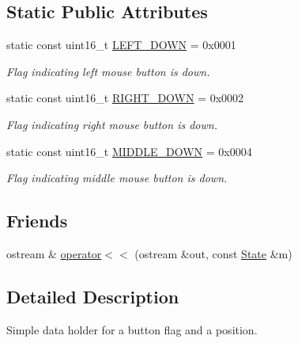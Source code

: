 \subsection*{Static Public Attributes}
\begin{DoxyCompactItemize}
\item 
static const uint16\-\_\-t \hyperlink{structmouse_1_1_state_a4f5eca97c989f6e8eceee194e2121fe8}{L\-E\-F\-T\-\_\-\-D\-O\-W\-N} = 0x0001
\begin{DoxyCompactList}\small\item\em Flag indicating left mouse button is down. \end{DoxyCompactList}\item 
static const uint16\-\_\-t \hyperlink{structmouse_1_1_state_ae07e315484a778beb62c47202be2808f}{R\-I\-G\-H\-T\-\_\-\-D\-O\-W\-N} = 0x0002
\begin{DoxyCompactList}\small\item\em Flag indicating right mouse button is down. \end{DoxyCompactList}\item 
static const uint16\-\_\-t \hyperlink{structmouse_1_1_state_ad6aff6557abd8a018d1c57d9fd224d85}{M\-I\-D\-D\-L\-E\-\_\-\-D\-O\-W\-N} = 0x0004
\begin{DoxyCompactList}\small\item\em Flag indicating middle mouse button is down. \end{DoxyCompactList}\end{DoxyCompactItemize}
\subsection*{Friends}
\begin{DoxyCompactItemize}
\item 
ostream \& \hyperlink{structmouse_1_1_state_a8c73b18ef2e5fc88aa180424b78bba09}{operator$<$$<$} (ostream \&out, const \hyperlink{structmouse_1_1_state}{State} \&m)
\end{DoxyCompactItemize}


\subsection{Detailed Description}
Simple data holder for a button flag and a position. 



